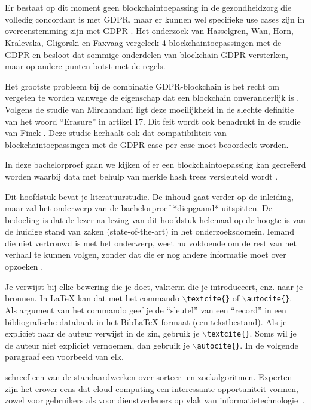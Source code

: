\chapter{}
\label{ch:stand-van-zaken}



Er bestaat op dit moment geen blockchaintoepassing in de gezondheidzorg die volledig concordant is met GDPR, maar er kunnen wel specifieke use cases zijn in overeenstemming zijn met GDPR \autocite{Hasselgren2020}. Het onderzoek van Hasselgren, Wan, Horn, Kralevska, Gligorski en Faxvaag \autocite{Hasselgren2020} vergeleek 4 blockchaintoepassingen met de GDPR en besloot dat sommige onderdelen van blockchain GDPR versterken, maar op andere punten botst met de regels.

Het grootste probleem bij de combinatie GDPR-blockchain is het recht om vergeten te worden vanwege de eigenschap dat een blockchain onveranderlijk is \autocite{Pilkington2016}. Volgens de studie van Mirchandani \autocite{Mirchandani2019} ligt deze moeilijkheid in de slechte definitie van het woord ``Erasure'' in artikel 17. Dit feit wordt ook benadrukt in de studie van Finck \autocite{Finck2019}. Deze studie herhaalt ook dat compatibiliteit van blockchaintoepassingen met de GDPR case per case moet beoordeelt worden.

In deze bachelorproef gaan we kijken of er een blockchaintoepassing kan gecreëerd worden waarbij data met behulp van merkle hash trees versleuteld wordt \autocite{Niaz2015}.

Dit hoofdstuk bevat je literatuurstudie. De inhoud gaat verder op de inleiding, maar zal het onderwerp van de bachelorproef *diepgaand* uitspitten. De bedoeling is dat de lezer na lezing van dit hoofdstuk helemaal op de hoogte is van de huidige stand van zaken (state-of-the-art) in het onderzoeksdomein. Iemand die niet vertrouwd is met het onderwerp, weet nu voldoende om de rest van het verhaal te kunnen volgen, zonder dat die er nog andere informatie moet over opzoeken \autocite{Pollefliet2011}.

Je verwijst bij elke bewering die je doet, vakterm die je introduceert, enz. naar je bronnen. In \LaTeX{} kan dat met het commando \texttt{$\backslash${textcite\{\}}} of \texttt{$\backslash${autocite\{\}}}. Als argument van het commando geef je de ``sleutel'' van een ``record'' in een bibliografische databank in het Bib\LaTeX{}-formaat (een tekstbestand). Als je expliciet naar de auteur verwijst in de zin, gebruik je \texttt{$\backslash${}textcite\{\}}.
Soms wil je de auteur niet expliciet vernoemen, dan gebruik je \texttt{$\backslash${}autocite\{\}}. In de volgende paragraaf een voorbeeld van elk.

\textcite{Knuth1998} schreef een van de standaardwerken over sorteer- en zoekalgoritmen. Experten zijn het erover eens dat cloud computing een interessante opportuniteit vormen, zowel voor gebruikers als voor dienstverleners op vlak van informatietechnologie~\autocite{Creeger2009}.

\lipsum[7-20]
